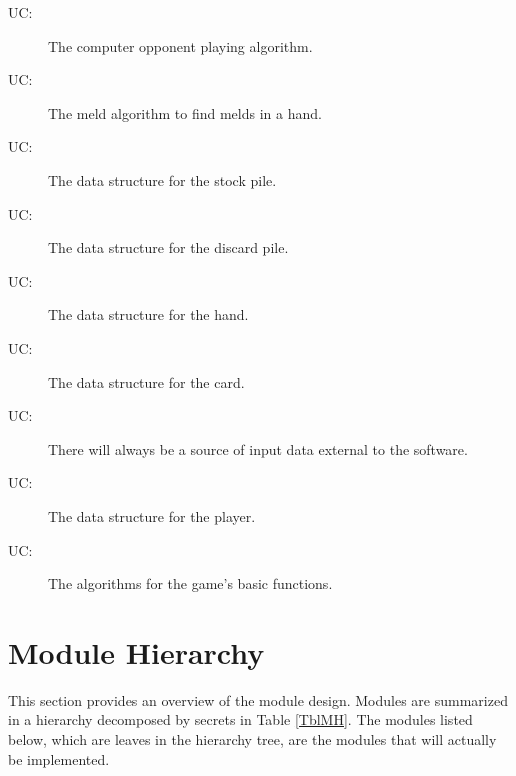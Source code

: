 \documentclass[12pt, titlepage]{article}
\newcounter{ucnum}
\newcommand{\uctheucnum}{UC\theucnum}
\begin{document}
\begin{description}
    \item[ \uctheucnum \label{ucCO}:] The computer opponent playing algorithm. 
    \item[ \uctheucnum \label{ucM}:] The meld algorithm to find melds in a hand. 
    \item[ \uctheucnum \label{ucSP}:] The data structure for the stock pile. 
    \item[ \uctheucnum \label{ucDP}:] The data structure for the discard pile. 
    \item[ \uctheucnum \label{ucH}:] The data structure for the hand. 
    \item[ \uctheucnum \label{ucC}:] The data structure for the card. 
    \item[ \uctheucnum \label{ucInput}:] There will always be a source of input data external to the software.
    \item[ \uctheucnum \label{ucP}:] The data structure for the player.
    \item[ \uctheucnum \label{ucG}:] The algorithms for the game's basic functions.
\end{description}

\section{Module Hierarchy} \label{SecMH}

This section provides an overview of the module design. Modules are summarized
in a hierarchy decomposed by secrets in Table \ref{TblMH}. The modules listed
below, which are leaves in the hierarchy tree, are the modules that will
actually be implemented.
\end{document}

